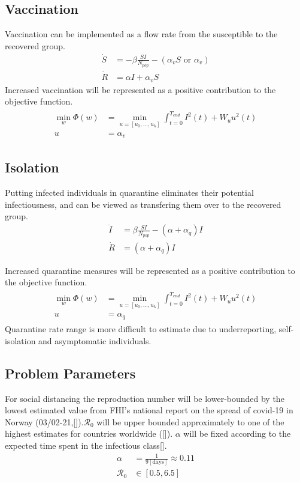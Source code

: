\subsection{Vaccination}
Vaccination can be implemented as a flow rate from the susceptible to the recovered group. 
\begin{align}
    \dot{S} &= -\beta \frac{SI}{N_{pop}} - (\alpha_v S\mbox{ or }  \alpha_v)\\
    \dot{R} &= \alpha I + \alpha_v S
\end{align}
Increased vaccination will be represented as a positive contribution to the objective function. 
\begin{align}
    \begin{split}
    \min_{w} \Phi(w) &= \min_{u = [u_0, \dots, u_k]} \int_{t=0}^{T_{end}} I^2(t) + W_u u^2(t)\\
    u &= \alpha_v
    \end{split}
\end{align}


\subsection{Isolation}
Putting infected individuals in quarantine eliminates their potential infectiousness, and can be viewed as transfering them over to the recovered group.
\begin{align}
    \dot{I} &= \beta \frac{SI}{N_{pop}} - (\alpha + \alpha_q) I\\
    \dot{R} &= (\alpha + \alpha_q) I
\end{align}

Increased quarantine measures will be represented as a positive contribution to the objective function.
\begin{align}
    \begin{split}
    \min_{w} \Phi(w) &= \min_{u = [u_0, \dots, u_k]} \int_{t=0}^{T_{end}} I^2(t) + W_u u^2(t)\\
    u &= \alpha_q
    \end{split}
\end{align}
Quarantine rate range is more difficult to estimate due to underreporting, self-isolation and asymptomatic individuals. 

\subsection{Problem Parameters}
\label{ch:Problem_Parameters}
For social distancing the reproduction number will be lower-bounded by the lowest estimated value from FHI's national report on the spread of covid-19 in Norway (03/02-21,[\cite{FHI_report}]).$\mathscr{R}_0$ will be upper bounded approximately to one of the highest estimates for countries worldwide ([\cite{France_high_R0}]). $\alpha$ will be fixed according to the expected time spent in the infectious class[\cite{Infectious_Period}]. 
\begin{align}
\alpha &= \frac{1}{9[\text{days}]} \approx 0.11\\
\mathscr{R}_0 &\in [0.5, 6.5]
\end{align}

